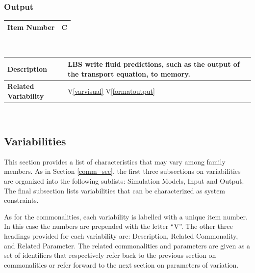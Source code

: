 \documentclass[12pt, notitlepage]{article}
\newcommand{\colAwidth}{0.24\textwidth}
\newcommand{\colBwidth}{0.76\textwidth}
\newcounter{comnum} %
\newcommand{\vref}[1]{V\ref{#1}}
\begin{document}
\subsubsection{Output}\label{comm_out}
\noindent
\begin{minipage}{\textwidth}
	\renewcommand*{\arraystretch}{1.5}
	\begin{tabular}{| p{\colAwidth} | p{\colBwidth}|}
		\hline
		\bf Item Number& C{comnum}\thecomnum\label{predictionstomemory} \\
		\hline
	\end{tabular}\\
	
	\begin{tabular}{| p{\colAwidth} | p{\colBwidth}|}		
		\hline
		\bf Description & LBS write fluid predictions, such as the output of the transport equation, to memory.\\
		\hline
		\bf Related Variability & \vref{varvisual} \vref{formatoutput} \\
		\hline
	\end{tabular}
\end{minipage}\\
\subsection{Variabilities}\label{var_sec}
This section provides a list of characteristics that may vary among family members. As in Section \ref{comm_sec}, the first three subsections on variabilities are organized into the following sublists: Simulation Models, Input and Output. The final subsection lists variabilities that can be characterized as system constraints. 

As for the commonalities, each variability is labelled with a unique item number. In this case the numbers are prepended with the letter ``V''. The other three headings provided for each variability are: Description, Related Commonality, and Related Parameter. The related commonalities and parameters are given as a set of identifiers that respectively refer back to the previous section on commonalities or refer forward to the next section on parameters of variation.
\end{document}
